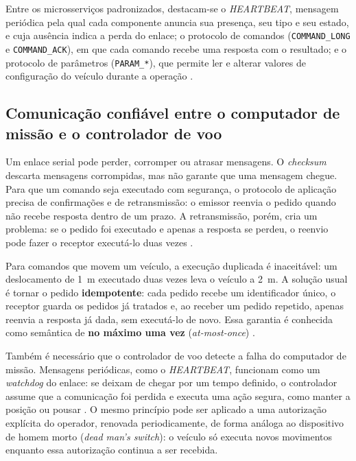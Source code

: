 Entre os microsserviços padronizados, destacam-se o \textit{HEARTBEAT}, mensagem periódica pela qual cada componente anuncia sua presença, seu tipo e seu estado, e cuja ausência indica a perda do enlace; o protocolo de comandos (\texttt{COMMAND\_LONG} e \texttt{COMMAND\_ACK}), em que cada comando recebe uma resposta com o resultado; e o protocolo de parâmetros (\texttt{PARAM\_*}), que permite ler e alterar valores de configuração do veículo durante a operação \cite{mavlinkguide}.

\subsection{Comunicação confiável entre o computador de missão e o controlador de voo}\label{subsec:comunicacao_confiavel}

Um enlace serial pode perder, corromper ou atrasar mensagens. O \textit{checksum} descarta mensagens corrompidas, mas não garante que uma mensagem chegue. Para que um comando seja executado com segurança, o protocolo de aplicação precisa de confirmações e de retransmissão: o emissor reenvia o pedido quando não recebe resposta dentro de um prazo. A retransmissão, porém, cria um problema: se o pedido foi executado e apenas a resposta se perdeu, o reenvio pode fazer o receptor executá-lo duas vezes \cite{tanenbaum2007}.

Para comandos que movem um veículo, a execução duplicada é inaceitável: um deslocamento de 1~m executado duas vezes leva o veículo a 2~m. A solução usual é tornar o pedido \textbf{idempotente}: cada pedido recebe um identificador único, o receptor guarda os pedidos já tratados e, ao receber um pedido repetido, apenas reenvia a resposta já dada, sem executá-lo de novo. Essa garantia é conhecida como semântica de \textbf{no máximo uma vez} (\textit{at-most-once}) \cite{tanenbaum2007}.

Também é necessário que o controlador de voo detecte a falha do computador de missão. Mensagens periódicas, como o \textit{HEARTBEAT}, funcionam como um \textit{watchdog} do enlace: se deixam de chegar por um tempo definido, o controlador assume que a comunicação foi perdida e executa uma ação segura, como manter a posição ou pousar \cite{mavlinkguide}. O mesmo princípio pode ser aplicado a uma autorização explícita do operador, renovada periodicamente, de forma análoga ao dispositivo de homem morto (\textit{dead man's switch}): o veículo só executa novos movimentos enquanto essa autorização continua a ser recebida.

